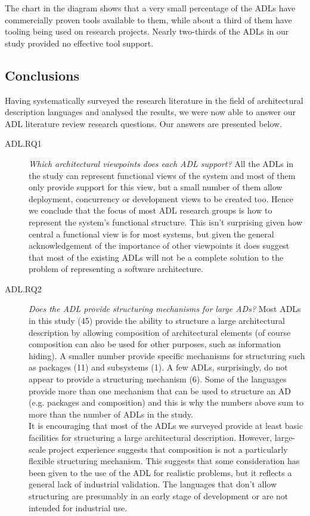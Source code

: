 The chart in the diagram shows that a very small percentage of the ADLs have commercially proven tools available to them, while about a third of them have tooling being used on research projects.  Nearly two-thirds of the ADLs in our study provided no effective tool support.

\subsection{Conclusions}

Having systematically surveyed the research literature in the field of architectural description languages and analysed the results, we were now able to answer our ADL literature review research questions.  Our answers are presented below.

\begin{description}
\item[ADL.RQ1] \emph{Which architectural viewpoints does each ADL support?}
All the ADLs in the study can represent functional views of the system and most of them only provide support for this view, but a small number of them allow deployment, concurrency or development views to be created too. Hence we conclude that the focus of most ADL research groups is how to represent the system's functional structure. This isn't surprising given how central a functional view is for most systems, but given the general acknowledgement of the importance of other viewpoints \cite{bachmann2011-documenting, brown2018-sad, kruchten1995-4plus1, rozanski2011-ssa2e} it does suggest that most of the existing ADLs will not be a complete solution to the problem of representing a software architecture.

\item[ADL.RQ2] \emph{Does the ADL provide structuring mechanisms for large ADs?}
Most ADLs in this study (45) provide the ability to structure a large architectural description by allowing composition of architectural elements (of course composition can also be used for other purposes, such as information hiding).   A smaller number provide specific mechanisms for structuring such as packages (11) and subsystems (1).  A few ADLs, surprisingly, do not appear to provide a structuring mechanism (6).  Some of the languages provide more than one mechanism that can be used to structure an AD (e.g. packages and composition) and this is why the numbers above sum to more than the number of ADLs in the study.\\
It is encouraging that most of the ADLs we surveyed provide at least basic facilities for structuring a large architectural description. However, large-scale project experience suggests that composition is not a particularly flexible structuring mechanism.  This suggests that some consideration has been given to the use of the ADL for realistic problems, but it reflects a general lack of industrial validation.  The languages that don't allow structuring are presumably in an early stage of development or are not intended for industrial use.


\end{description}
